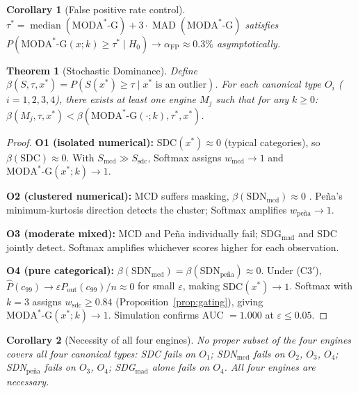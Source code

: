 \documentclass[11pt]{article}
\theoremstyle{plain}
\newtheorem{theorem}{Theorem}
\newtheorem{corollary}{Corollary}
\theoremstyle{definition}
\DeclareMathOperator{\MAD}{MAD}
\DeclareMathOperator{\median}{median}
\newcommand{\moda}{\text{MODA}^*\text{-G}}
\begin{document}
\begin{corollary}[False positive rate control]
\label{cor:fpr}
$\tau^* = \median(\moda) + 3\cdot\MAD(\moda)$ satisfies
$P(\moda(x;k) \geq \tau^* \mid H_0) \to \alpha_\text{FP}
\approx 0.3\%$ asymptotically.
\end{corollary}

\begin{theorem}[Stochastic Dominance]
\label{thm:dominance}
Define $\beta(S, \tau, x^*) = P(S(x^*) \geq \tau \mid
x^* \text{ is an outlier})$. For each canonical type
$O_i$ ($i=1,2,3,4$), there exists at least one engine
$M_j$ such that for any $k \geq 0$:
$\beta(M_j, \tau, x^*) < \beta(\moda(\cdot;k),
\tau^*, x^*)$.
\end{theorem}

\begin{proof}
\textbf{O1 (isolated numerical):}
$\text{SDC}(x^*) \approx 0$ (typical categories), so
$\beta(\text{SDC}) \approx 0$. With
$S_\text{mcd} \gg S_\text{sdc}$, Softmax assigns
$w_\text{mcd} \to 1$ and $\moda(x^*;k) \to 1$.

\textbf{O2 (clustered numerical):}
MCD suffers masking, $\beta(\text{SDN}_\text{mcd})
\approx 0$ \citep{pena2001}. Pe\~{n}a's minimum-kurtosis
direction detects the cluster; Softmax amplifies
$w_\text{pe\~{n}a} \to 1$.

\textbf{O3 (moderate mixed):}
MCD and Pe\~{n}a individually fail; SDG$_\text{mad}$
and SDC jointly detect. Softmax amplifies whichever
scores higher for each observation.

\textbf{O4 (pure categorical):}
$\beta(\text{SDN}_\text{mcd}) = \beta(\text{SDN}
_\text{pe\~{n}a}) \approx 0$.
Under (C3$'$), $\hat{P}(c_{99}) \to
\varepsilon P_\text{out}(c_{99})/n \approx 0$ for small
$\varepsilon$, making $\text{SDC}(x^*) \to 1$.
Softmax with $k=3$ assigns $w_\text{sdc} \geq 0.84$
(Proposition~\ref{prop:gating}), giving
$\moda(x^*;k) \to 1$. Simulation confirms
AUC $= 1.000$ at $\varepsilon \leq 0.05$.
\end{proof}

\begin{corollary}[Necessity of all four engines]
\label{cor:necessity}
No proper subset of the four engines covers all four
canonical types: SDC fails on $O_1$; SDN$_\text{mcd}$
fails on $O_2$, $O_3$, $O_4$; SDN$_\text{pe\~{n}a}$
fails on $O_3$, $O_4$; SDG$_\text{mad}$ alone fails
on $O_4$. All four engines are necessary.
\end{corollary}
\end{document}
